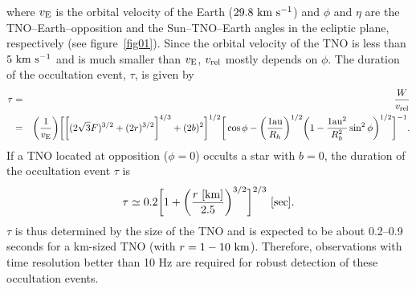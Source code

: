 \documentclass{pasj01}
\newcommand{\void}[1]{}
\renewcommand{\textcolor}{\void}
\begin{document}
where $v_{\rm E}$ is the orbital velocity of the Earth ($29.8 \ {\rm km\ s^{-1}}$) 
and $\phi$ and $\eta$ are the TNO--Earth--opposition and the Sun--TNO--Earth angles in the ecliptic plane, respectively (see figure~\ref{fig01}).
Since the orbital velocity of the TNO is less than $5 \ {\rm km \ s^{-1}}$ and is much smaller than $v_{\rm E}$,
$v_{\rm rel}$ mostly depends on $\phi$.
The duration of the occultation event, $\tau$, is given by 
\begin{eqnarray}
\tau  & = &  \frac{W}{v_{\rm rel}} \\
& = & \bigg( \frac{1}{v_{\rm E}} \bigg) \bigg[ \bigg[ (2\sqrt{3}F)^{3/2} +  \textcolor{red}{(2 r)^{3/2}} \bigg]^{4/3} + (2b)^2 \bigg]^{1/2} \bigg[ \cos{\phi} - \bigg( \frac{1 {\rm au}}{R_h} \bigg)^{1/2} \bigg(1 -  \frac{1 {\rm au}^2}{R_h^2} \sin^2{\phi} \bigg)^{1/2} \bigg]^{-1}. 
\end{eqnarray}
If a TNO located at opposition ($\phi = 0$) occults a star with $b=0$,  the duration of the occultation event $\tau$ is 
\begin{eqnarray}
\tau  \simeq 0.2 \bigg[ 1 +  \bigg(\textcolor{red}{ \frac{r\ [{\rm km}]}{2.5}} \bigg)^{3/2} \bigg]^{2/3}  \ [{\rm sec}].
\end{eqnarray}
$\tau$ is thus determined by the size of the TNO 
and is expected to be about \textcolor{red}{0.2--0.9} seconds for a km-sized TNO (with \textcolor{red}{$r=1-10 \ {\rm km}$}). 
Therefore, observations with time resolution better than 10 Hz are required
for robust detection of these occultation events.
\end{document}
